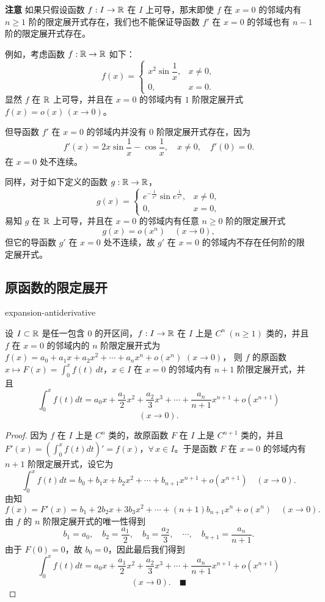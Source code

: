 \textbf{注意} 如果只假设函数 $f:I\to\mathbb{R}$ 在 $I$ 上可导，那末即使 $f$ 在 $x=0$ 的邻域内有 $n\geqslant1$ 阶的限定展开式存在，我们也不能保证导函数 $f'$ 在 $x=0$ 的邻域也有 $n-1$ 阶的限定展开式存在。

例如，考虑函数 $f:\mathbb{R}\to\mathbb{R}$ 如下：
\[f(x)=\begin{cases} x^2\sin\dfrac{1}{x}, & x\neq0,\\[1ex] 0, & x=0. \end{cases}\]
显然 $f$ 在 $\mathbb{R}$ 上可导，并且在 $x=0$ 的邻域内有 $1$ 阶限定展开式 $f(x)=o(x)\,(x\to0)$。

但导函数 $f'$ 在 $x=0$ 的邻域内并没有 $0$ 阶限定展开式存在，因为
\[f'(x)=2x\sin\frac{1}{x}-\cos\frac{1}{x},\quad x\neq0,\quad f'(0)=0.\]
在 $x=0$ 处不连续。

同样，对于如下定义的函数 $g:\mathbb{R}\to\mathbb{R}$，
\[g(x)=\begin{cases} e^{-\frac{1}{x^2}}\sin e^{\frac{1}{x^2}}, & x\neq0,\\[1ex] 0, & x=0, \end{cases}\]
易知 $g$ 在 $\mathbb{R}$ 上可导，并且在 $x=0$ 的邻域内有任意 $n\geqslant0$ 阶的限定展开式
\[g(x)=o(x^n)\quad(x\to0),\]
但它的导函数 $g'$ 在 $x=0$ 处不连续，故 $g'$ 在 $x=0$ 的邻域内不存在任何阶的限定展开式。

\subsection{原函数的限定展开}

\begin{mythm}{}{expansion-antiderivative}

设 $I\subset\mathbb{R}$ 是任一包含 $0$ 的开区间，$f:I\to\mathbb{R}$ 在 $I$ 上是 $C^n\ (n\geqslant1)$ 类的，并且 $f$ 在 $x=0$ 的邻域内的 $n$ 阶限定展开式为 $f(x)=a_0+a_1x+a_2x^2+\cdots+a_nx^n+o(x^n)$ $(x\to0)$，
则 $f$ 的原函数 $x\longmapsto F(x)=\displaystyle\int_0^xf(t)\,dt$，$x\in I$ 在 $x=0$ 的邻域内有 $n+1$ 阶限定展开式，并且
\[\int_{0}^{x}f(t)dt=a_{0}x+\frac{a_{1}}{2}x^{2}+\frac{a_{2}}{3}x^{3}+\cdots+\frac{a_{n}}{n+1}x^{n+1}+o(x^{n+1})\]
\[(x\to0).\]

\end{mythm}

\begin{proof}

因为 $f$ 在 $I$ 上是 $C^n$ 类的，故原函数 $F$ 在 $I$ 上是 $C^{n+1}$ 类的，并且 $F'(x)=\left(\displaystyle\int_0^xf(t)dt\right)'=f(x)$，$\forall\,x\in I$。于是函数 $F$ 在 $x=0$ 的邻域内有 $n+1$ 阶限定展开式，设它为
\[\int_{0}^{x}f(t)dt=b_{0}+b_{1}x+b_{2}x^{2}+\cdots+b_{n+1}x^{n+1}+o(x^{n+1})\quad(x\to0).\]
由知
\[f(x)=F'(x)=b_{1}+2b_{2}x+3b_{3}x^{2}+\cdots+(n+1)b_{n+1}x^{n}+o(x^{n})\quad(x\to0).\]
由 $f$ 的 $n$ 阶限定展开式的唯一性得到
\[b_1=a_0,\quad b_2=\frac{a_1}{2},\quad b_3=\frac{a_2}{3},\quad\cdots,\quad b_{n+1}=\frac{a_n}{n+1}.\]
由于 $F(0)=0$，故 $b_0=0$，因此最后我们得到
\[\int_0^xf(t)dt=a_0x+\frac{a_1}{2}x^2+\frac{a_2}{3}x^3+\cdots+\frac{a_n}{n+1}x^{n+1}+o(x^{n+1})\]
\[(x\to0).\quad\blacksquare\]

\end{proof}

